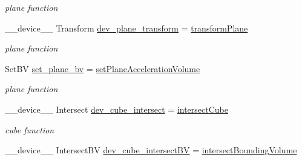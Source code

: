 \begin{DoxyCompactItemize}
\begin{DoxyCompactList}\small\item\em plane function \end{DoxyCompactList}\item 
\+\_\+\+\_\+device\+\_\+\+\_\+ Transform \hyperlink{group__device__pointers_ga2515bf686c92a25ea08f35a1af5ff5af}{dev\+\_\+plane\+\_\+transform} = \hyperlink{group__intersection__test__prperties_ga6d2ae68047e8f8d11a64b9dc9dda507d}{transform\+Plane}\hypertarget{group__device__pointers_ga2515bf686c92a25ea08f35a1af5ff5af}{}\label{group__device__pointers_ga2515bf686c92a25ea08f35a1af5ff5af}

\begin{DoxyCompactList}\small\item\em plane function \end{DoxyCompactList}\item 
Set\+BV \hyperlink{group__device__pointers_gadad9e63712118e3425b0e754615f70d4}{set\+\_\+plane\+\_\+bv} = \hyperlink{group__intersection__test__prperties_ga684f41eb2add27e32a7c0115cdd6cce1}{set\+Plane\+Acceleration\+Volume}\hypertarget{group__device__pointers_gadad9e63712118e3425b0e754615f70d4}{}\label{group__device__pointers_gadad9e63712118e3425b0e754615f70d4}

\begin{DoxyCompactList}\small\item\em plane function \end{DoxyCompactList}\item 
\+\_\+\+\_\+device\+\_\+\+\_\+ Intersect \hyperlink{group__device__pointers_gafba3ff50c17e36337c7578ead7cc6f1e}{dev\+\_\+cube\+\_\+intersect} = \hyperlink{group__intersection__test__prperties_gae4778d3b0c160c9757d7fca0e5deefa2}{intersect\+Cube}\hypertarget{group__device__pointers_gafba3ff50c17e36337c7578ead7cc6f1e}{}\label{group__device__pointers_gafba3ff50c17e36337c7578ead7cc6f1e}

\begin{DoxyCompactList}\small\item\em cube function \end{DoxyCompactList}\item 
\+\_\+\+\_\+device\+\_\+\+\_\+ Intersect\+BV \hyperlink{group__device__pointers_ga0d5bc928c76877f9dd81cb8580b7fc1e}{dev\+\_\+cube\+\_\+intersect\+BV} = \hyperlink{group__intersection__test__prperties_gaf6bbee9e8a6ee564017fa94cd9e6ec63}{intersect\+Bounding\+Volume}\hypertarget{group__device__pointers_ga0d5bc928c76877f9dd81cb8580b7fc1e}{}\label{group__device__pointers_ga0d5bc928c76877f9dd81cb8580b7fc1e}


\end{DoxyCompactItemize}
